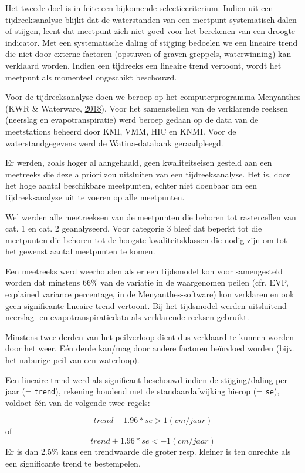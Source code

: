 \documentclass[11pt,]{book}
\begin{document}
Het tweede doel is in feite een bijkomende selectiecriterium. Indien uit
een tijdreeksanalyse blijkt dat de waterstanden van een meetpunt
systematisch dalen of stijgen, leent dat meetpunt zich niet goed voor
het berekenen van een droogte-indicator. Met een systematische daling of
stijging bedoelen we een lineaire trend die niet door externe factoren
(opstuwen of graven greppels, waterwinning) kan verklaard worden. Indien
een tijdreeks een lineaire trend vertoont, wordt het meetpunt als
momenteel ongeschikt beschouwd.

Voor de tijdreeksanalyse doen we beroep op het computerprogramma
Menyanthes (KWR \& Waterware, \protect\hyperlink{ref-RN5899}{2018}).
Voor het samenstellen van de verklarende reeksen (neerslag en
evapotranspiratie) werd beroep gedaan op de data van de meetstations
beheerd door KMI, VMM, HIC en KNMI. Voor de waterstandgegevens werd de
Watina-databank geraadpleegd.

Er werden, zoals hoger al aangehaald, geen kwaliteitseisen gesteld aan
een meetreeks die deze a priori zou uitsluiten van een tijdreeksanalyse.
Het is, door het hoge aantal beschikbare meetpunten, echter niet
doenbaar om een tijdreeksanalyse uit te voeren op alle meetpunten.

Wel werden alle meetreeksen van de meetpunten die behoren tot
rastercellen van cat. 1 en cat. 2 geanalyseerd. Voor categorie 3 bleef
dat beperkt tot die meetpunten die behoren tot de hoogste
kwaliteitsklassen die nodig zijn om tot het gewenst aantal meetpunten te
komen.

Een meetreeks werd weerhouden als er een tijdsmodel kon voor
samengesteld worden dat minstens 66\% van de variatie in de waargenomen
peilen (cfr. EVP, explained variance percentage, in de
Menyanthes-software) kon verklaren en ook geen significante lineaire
trend vertoont. Bij het tijdsmodel werden uitsluitend neerslag- en
evapotranspiratiedata als verklarende reeksen gebruikt.

Minstens twee derden van het peilverloop dient dus verklaard te kunnen
worden door het weer. Eén derde kan/mag door andere factoren beïnvloed
worden (bijv. het naburige peil van een waterloop).

Een \protect\hypertarget{lintrend}{}{lineaire trend} werd als
significant beschouwd indien de stijging/daling per jaar (=
\texttt{trend}), rekening houdend met de standaardafwijking hierop (=
\texttt{se}), voldoet één van de volgende twee regels:

\[trend - 1.96* se > 1(cm/jaar)\] of \[trend + 1.96* se < -1(cm/jaar)\]
Er is dan 2.5\% kans een trendwaarde die groter resp. kleiner is ten
onrechte als een significante trend te bestempelen.
\end{document}
